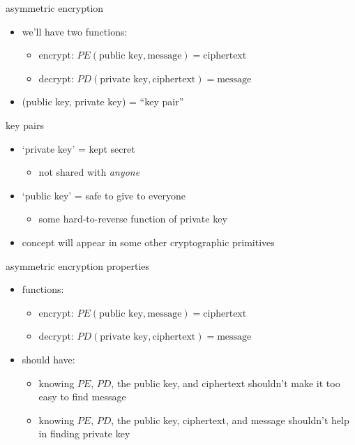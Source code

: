 \begin{frame}{asymmetric encryption}
\begin{itemize}
\item we'll have two functions:
    \begin{itemize}
    \item encrypt: $PE(\text{public key}, \text{message}) = \text{ciphertext}$
    \item decrypt: $PD(\text{private key}, \text{ciphertext}) = \text{message}$
    \end{itemize}
\item (public key, private key) = ``key pair''
\end{itemize}
\end{frame}

\begin{frame}{key pairs}
    \begin{itemize}
    \item `private key' = kept secret
        \begin{itemize}
        \item not shared with \textit{anyone}
        \end{itemize}
    \item `public key' = safe to give to everyone
        \begin{itemize}
        \item some hard-to-reverse function of private key
        \end{itemize}
    \vspace{.5cm}
    \item concept will appear in some other cryptographic primitives
    \end{itemize}
\end{frame}

\begin{frame}{asymmetric encryption properties}
\begin{itemize}
\item functions:
    \begin{itemize}
    \item encrypt: $PE(\text{public key}, \text{message}) = \text{ciphertext}$
    \item decrypt: $PD(\text{private key}, \text{ciphertext}) = \text{message}$
    \end{itemize}
\item should have:
    \begin{itemize}
    \item knowing $PE$, $PD$, the public key, and ciphertext shouldn't make it too easy to find message
    \item knowing $PE$, $PD$, the public key, ciphertext, and message shouldn't help in finding private key
    \end{itemize}
\end{itemize}
\end{frame}

